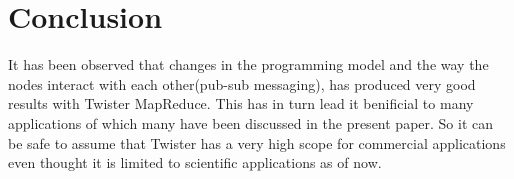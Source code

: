 \documentclass[9pt,twocolumn,twoside]{../../styles/osajnl}
\begin{document}
\section{Conclusion}
It has been observed that changes in the programming model and the way
the nodes interact with each other(pub-sub
messaging)\cite{ekanayake2010twister}, has produced very good results
with Twister MapReduce. This has in turn lead it benificial to many
applications of which many have been discussed in the present
paper. So it can be safe to assume that Twister has a very high scope
for commercial applications even thought it is limited to scientific
applications as of now.


 
\end{document}
